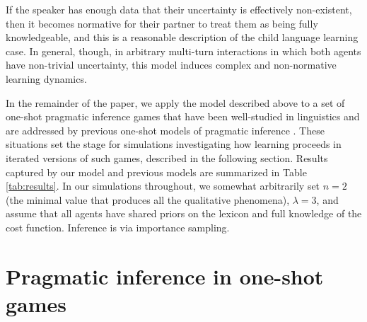 \documentclass{article} %
\newcommand{\word}{\text{word}}
\newcommand{\obj}{\text{object}}
\newcommand{\lex}{\text{lexicon}}
\begin{document}

If the speaker has enough data that their
uncertainty is effectively non-existent, then it becomes normative for
their partner to treat them as being fully knowledgeable, and this is
a reasonable description of the child language learning case. In
general, though, in arbitrary multi-turn interactions in which both
agents have non-trivial uncertainty, this model induces complex and
non-normative learning dynamics. 

In the remainder of the paper, we apply the model described above to a set of one-shot
pragmatic inference games that have been well-studied in linguistics
\cite{grice1975,horn1984} and are addressed by previous one-shot
models of pragmatic inference \cite{frank2012,bergen2012}. These
situations set the stage for simulations investigating how learning
proceeds in iterated versions of such games, described in the
following section. Results captured by our model and previous models
are summarized in Table \ref{tab:results}. In
  our simulations throughout, we somewhat arbitrarily set $n = 2$ (the
  minimal value that produces all the qualitative phenomena), $\lambda
  = 3$, and assume that all agents have shared priors on the lexicon
  and full knowledge of the cost function. Inference is via importance
  sampling.

%
%
%
%
%

\section{Pragmatic inference in one-shot games}
\end{document}
